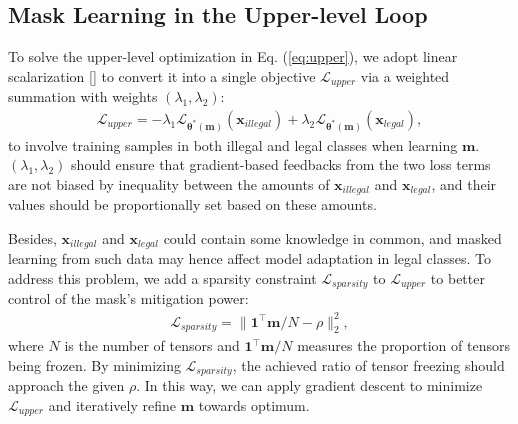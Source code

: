 \documentclass{article}
\begin{document}
\subsection{Mask Learning in the Upper-level Loop}
To solve the upper-level optimization in Eq. (\ref{eq:upper}), we adopt linear scalarization [] to convert it into a single objective $\mathcal{L}_{upper}$ via a weighted summation with weights $(\lambda_1, \lambda_2)$:
\begin{align}\label{eq:loss_upper}
\mathcal{L}_{upper} = -\lambda_1 \mathcal{L}_{\boldsymbol{\theta}^{*}(\mathbf{m})}(\mathbf{x}_{illegal}) + 
\lambda_2 \mathcal{L}_{\boldsymbol{\theta}^{*}(\mathbf{m})}(\mathbf{x}_{legal}),
\end{align}
to involve training samples in both illegal and legal classes when learning $\mathbf{m}$. $(\lambda_1, \lambda_2)$ should ensure that gradient-based feedbacks from the two loss terms are not biased by inequality between the amounts of $\mathbf{x}_{illegal}$ and $\mathbf{x}_{legal}$, and their values should be proportionally set based on these amounts.

Besides, $\mathbf{x}_{illegal}$ and $\mathbf{x}_{legal}$ could contain some knowledge in common, and masked learning from such data may hence affect model adaptation in legal classes. To address this problem, we add a sparsity constraint $\mathcal{L}_{sparsity}$ to $\mathcal{L}_{upper}$ to better control of the mask's mitigation power:
\begin{align}
\mathcal{L}_{sparsity} = \|\mathbf{1}^{\top} \mathbf{m}/N - \rho \|_2^2,
\end{align}
where $N$ is the number of tensors and $\mathbf{1}^{\top} \mathbf{m}/N$ measures the proportion of tensors being frozen. By minimizing $\mathcal{L}_{sparsity}$, the achieved ratio of tensor freezing should approach the given $\rho$. In this way, we can apply gradient descent to minimize $\mathcal{L}_{upper}$ and iteratively refine $\mathbf{m}$ towards optimum.
\end{document}
